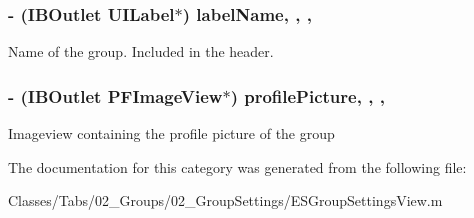 \subsubsection[{label\+Name}]{\setlength{\rightskip}{0pt plus 5cm}-\/ (I\+B\+Outlet U\+I\+Label$\ast$) label\+Name\hspace{0.3cm}{\ttfamily [read]}, {\ttfamily [write]}, {\ttfamily [nonatomic]}, {\ttfamily [strong]}}\label{category_e_s_group_settings_view_07_08_af9c9b0aeed690eb221a0450772472e6b}
Name of the group. Included in the header. \hypertarget{category_e_s_group_settings_view_07_08_a002b06f190c526e34a9debe2955f4a19}{}
\subsubsection[{profile\+Picture}]{\setlength{\rightskip}{0pt plus 5cm}-\/ (I\+B\+Outlet P\+F\+Image\+View$\ast$) profile\+Picture\hspace{0.3cm}{\ttfamily [read]}, {\ttfamily [write]}, {\ttfamily [nonatomic]}, {\ttfamily [strong]}}\label{category_e_s_group_settings_view_07_08_a002b06f190c526e34a9debe2955f4a19}
Imageview containing the profile picture of the group 

The documentation for this category was generated from the following file\+:\begin{DoxyCompactItemize}
\item 
Classes/\+Tabs/02\+\_\+\+Groups/02\+\_\+\+Group\+Settings/E\+S\+Group\+Settings\+View.\+m\end{DoxyCompactItemize}

